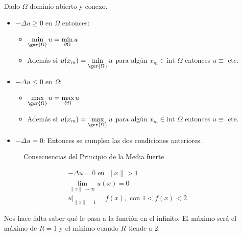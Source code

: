 		\begin{theorem}  \label{prop:MaximoFuerte}

			Dado $\Omega$ dominio abierto y conexo.

			\begin{itemize}
				\item $-\Delta u \geq 0$ en $\Omega$ entonces:
				\begin{itemize}
					\item $\min\limits_{\gor{\Omega}} u = \min\limits_{\partial \Omega} u$
					\item Además si $u(x_m) = \min\limits_{\gor{\Omega}} u$ para algún $x_m \in \text{int } \Omega$ entonces $u \equiv$ cte.
				\end{itemize}

				\item $-\Delta u \leq 0$ en $\Omega$:
				\begin{itemize}
					\item $\max\limits_{\gor{\Omega}} u = \max\limits_{\partial \Omega} u$
					\item Además si $u(x_m) = \max\limits_{\gor{\Omega}} u$ para algún $x_m \in \text{int } \Omega$ entonces $u \equiv$ cte.
				\end{itemize}

				\item $-\Delta u = 0$: Entonces se cumplen las dos condiciones anteriores.

			\end{itemize}

		\end{theorem}

		\begin{figure}[hbtp]
			\begin{minipage}[t]{0.33\linewidth}
			\end{minipage}
			\begin{minipage}[t]{0.33\linewidth}
			\end{minipage}
			\begin{minipage}[t]{0.33\linewidth}
			\end{minipage}
			\caption{Consecuencias del Principio de la Media fuerte}
		\end{figure}

		\begin{example}

			\[\begin{array}{l}
				-\Delta u = 0 \text{ en } \|x\| > 1 \\
				\lim\limits_{\|x\| \to \infty} u(x) = 0 \\
				u|_{\|x\| = 1} = f(x), \text{ con } 1 < f(x) < 2
			\end{array}\]

			Nos hace falta saber qué le pasa a la función en el infinito. El máximo será el máximo de $R=1$ y el mínimo cuando $R$ tiende a 2.

		\end{example}


